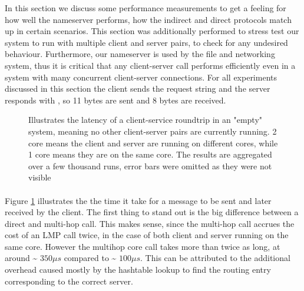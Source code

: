 In this section we discuss some performance measurements to get a feeling for how well the nameserver performs, how the indirect and direct protocols match up in certain scenarios. This section was additionally performed to stress test our system to run with multiple client and server pairs, to check for any undesired behaviour. Furthermore, our nameserver is used by the file and networking system, thus it is critical that any client-server call performs efficiently even in a system with many concurrent client-server connections. For all experiments discussed  in this section the client sends the request string  and the server responds with , so 11 bytes are sent and 8 bytes are received.
\begin{figure}[ht]
    \centering
    
        \scalebox{0.5}{
            \hspace{-0.40in}
            
        }
    \caption{Illustrates the latency of a client-service roundtrip in an "empty" system, meaning no other client-server pairs are currently running. 2 core means the client and server are running on different cores, while 1 core means they are on the same core. The results are aggregated over a few thousand runs, error bars were omitted as they were not visible}
    \label{fig:ns_rtt}
    
\end{figure}
\paragraph{}

Figure \ref{fig:ns_rtt} illustrates the the time it take for a message to be sent and later received by the client. The first thing to stand out is the big difference between a direct and multi-hop call. This makes sense, since the multi-hop call accrues the cost of an LMP call twice, in the case of both client and server running on the same core. However the multihop core call takes more than twice as long, at around \~ $350\mu s$ compared to  \~ $100\mu s$. This can be attributed to the additional overhead caused mostly by the hashtable lookup to find the routing entry corresponding to the correct server.



